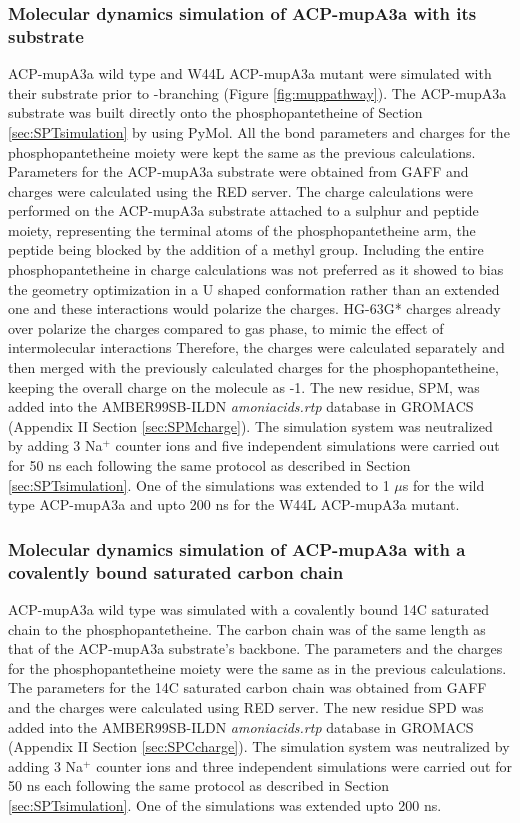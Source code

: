 					
			\subsubsection{Molecular dynamics simulation of ACP-mupA3a with its substrate}
			\label{sec:SPMsimulation}			
			ACP-mupA3a wild type and W44L ACP-mupA3a mutant were simulated with their substrate prior to \bet-branching (Figure \ref{fig:muppathway}). The ACP-mupA3a substrate was built directly onto the phosphopantetheine  of Section \ref{sec:SPTsimulation} by using PyMol. All the bond parameters and charges for the phosphopantetheine moiety were kept the same as the previous calculations. Parameters for the ACP-mupA3a substrate were obtained from GAFF and charges were calculated using the RED server. The charge calculations were performed on the ACP-mupA3a substrate attached to a sulphur and peptide moiety, representing the terminal atoms of the phosphopantetheine arm, the peptide being blocked by the addition of a methyl group. Including the entire phosphopantetheine in charge calculations was not preferred as it showed to bias the geometry optimization in a U shaped conformation rather than an extended one and these interactions would polarize the charges. HG-63G* charges already over polarize the charges compared to gas phase, to mimic the effect of intermolecular interactions \parencite{Winn1997} Therefore, the charges were calculated separately and then merged with the previously calculated charges for the phosphopantetheine, keeping the overall charge on the molecule as -1. The new residue, SPM, was added into the AMBER99SB-ILDN \textit{amoniacids.rtp} database in GROMACS (Appendix II Section \ref{sec:SPMcharge}). The simulation system was neutralized by adding 3 Na$ ^{+} $ counter ions and five independent simulations were carried out for 50 ns each following the same protocol as described in Section  \ref{sec:SPTsimulation}. One of the simulations was extended to 1 $ \mu $s for the wild type ACP-mupA3a and upto 200 ns for the W44L ACP-mupA3a mutant. 

			\subsubsection{Molecular dynamics simulation of ACP-mupA3a with a covalently bound saturated carbon chain}
			\label{sec:SPCsimulation}
			ACP-mupA3a wild type was simulated with a covalently bound 14C saturated chain to the phosphopantetheine. The carbon chain was of the same length as that of the ACP-mupA3a substrate's backbone. The parameters and the charges for the phosphopantetheine moiety were the same as in the previous calculations. The parameters for the 14C saturated carbon chain was obtained from GAFF and the charges were calculated using RED server. The new residue SPD was added into the AMBER99SB-ILDN \textit{amoniacids.rtp} database in GROMACS (Appendix II Section \ref{sec:SPCcharge}). The simulation system was neutralized by adding 3 Na$ ^{+} $ counter ions and three independent simulations were carried out for 50 ns each following the same protocol as described in Section  \ref{sec:SPTsimulation}. One of the simulations was extended upto 200 ns. 
			
